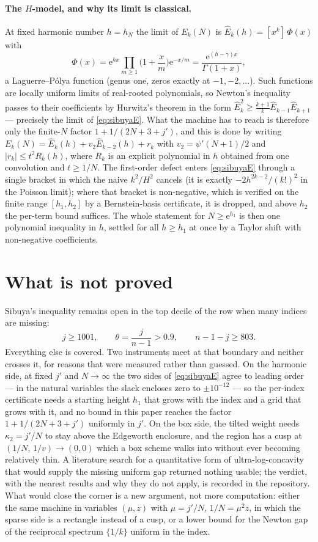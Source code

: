\documentclass[12pt]{article}
\newcommand{\ee}{\mathrm{e}}
\begin{document}
\paragraph{The $H$-model, and why its limit is classical.}
At fixed harmonic number $h = h_N$ the limit of $E_k(N)$ is $\hat E_k(h) = [x^k]\,\Phi(x)$ with
\[
\Phi(x) = \ee^{hx}\prod_{m\ge1}\Big(1+\frac{x}{m}\Big)\ee^{-x/m} = \frac{\ee^{(h-\gamma)x}}{\Gamma(1+x)} ,
\]
a Laguerre--P\'olya function (genus one, zeros exactly at $-1,-2,\dots$). Such functions are locally uniform limits of real-rooted polynomials, so Newton's inequality passes to their coefficients by Hurwitz's theorem in the form $\hat E_k^2 \ge \frac{k+1}{k}\hat E_{k-1}\hat E_{k+1}$ --- precisely the limit of \eqref{eq:sibuyaE}. What the machine has to reach is therefore only the finite-$N$ factor $1+1/(2N+3+j')$, and this is done by writing $E_k(N) = \hat E_k(h) + v_2\hat E_{k-2}(h) + r_k$ with $v_2 = \psi'(N+1)/2$ and $|r_k| \le t^2 R_k(h)$, where $R_k$ is an explicit polynomial in $h$ obtained from one convolution and $t\ge1/N$. The first-order defect enters \eqref{eq:sibuyaE} through a single bracket in which the naive $k^2/H^2$ cancels (it is exactly $-2h^{2k-2}/(k!)^2$ in the Poisson limit); where that bracket is non-negative, which is verified on the finite range $[h_1,h_2]$ by a Bernstein-basis certificate, it is dropped, and above $h_2$ the per-term bound suffices. The whole statement for $N\ge\ee^{h_1}$ is then one polynomial inequality in $h$, settled for all $h\ge h_1$ at once by a Taylor shift with non-negative coefficients.

\section{What is not proved}\label{sec:open}

Sibuya's inequality remains open in the top decile of the row when many indices are missing:
\[
j \ge 1001, \qquad \theta = \frac{j}{n-1} > 0.9, \qquad n-1-j \ge 803 .
\]
Everything else is covered. Two instruments meet at that boundary and neither crosses it, for reasons that were measured rather than guessed. On the harmonic side, at fixed $j'$ and $N\to\infty$ the two sides of \eqref{eq:sibuyaE} agree to leading order --- in the natural variables the slack encloses zero to $\pm10^{-12}$ --- so the per-index certificate needs a starting height $h_1$ that grows with the index and a grid that grows with it, and no bound in this paper reaches the factor $1+1/(2N+3+j')$ uniformly in $j'$. On the box side, the tilted weight needs $\kappa_2 = j'/N$ to stay above the Edgeworth enclosure, and the region has a cusp at $(1/N,\,1/v)\to(0,0)$ which a box scheme walks into without ever becoming relatively thin. A literature search for a quantitative form of ultra-log-concavity that would supply the missing uniform gap returned nothing usable; the verdict, with the nearest results and why they do not apply, is recorded in the repository. What would close the corner is a new argument, not more computation: either the same machine in variables $(\mu, z)$ with $\mu = j'/N$, $1/N = \mu^2 z$, in which the sparse side is a rectangle instead of a cusp, or a lower bound for the Newton gap of the reciprocal spectrum $\{1/k\}$ uniform in the index.
\end{document}

